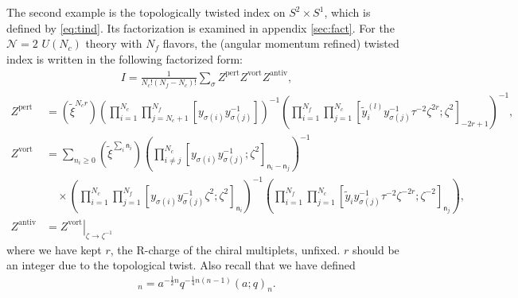 \documentclass[a4paper,11pt]{article}
\begin{document}
The second example is the topologically twisted index on $S^2 \times S^1$, which is defined by \eqref{eq:tind}. Its factorization is examined in appendix \ref{sec:fact}. For the $\mathcal N = 2$ $U(N_c)$ theory with $N_f$ flavors, the (angular momentum refined) twisted index is written in the following factorized form:
\begin{align}
I = \frac{1}{N_c! (N_f-N_c)!} \sum_{\sigma} Z^\text{pert} Z^\text{vort} Z^\text{antiv},
\end{align}
%
\begin{align}
%
Z^\text{pert} &= \left(\tilde \xi^{N_c r}\right) \left(\prod_{i = 1}^{N_c} \prod_{j = N_c+1}^{N_f} \left[y_{\sigma(i)} y_{\sigma(j)}^{-1}\right]\right)^{-1} \left(\prod_{i = 1}^{N_f} \prod_{j = 1}^{N_c} \left[\tilde y^{(l)}_i y_{\sigma(j)}^{-1} \tau^{-2} \zeta^{2 r};\zeta^2\right]_{-2 r+1}\right)^{-1}, \\
%
Z^\text{vort} &= \sum_{n_i \geq 0} \left(\tilde \xi^{\sum_i \mathsf n_i}\right) \left(\prod_{i \neq j}^{N_c} \left[y_{\sigma(i)} y_{\sigma(j)}^{-1};\zeta^2\right]_{\mathsf n_i-\mathsf n_j}\right)^{-1} \nonumber \\
%
& \quad \times \left(\prod_{i = 1}^{N_c} \prod_{j = 1}^{N_f} \left[y_{\sigma(i)} y_{\sigma(j)}^{-1} \zeta^2;\zeta^2\right]_{\mathsf n_i}\right)^{-1} \left(\prod_{i = 1}^{N_f} \prod_{j = 1}^{N_c} \left[\tilde y_i y_{\sigma(j)}^{-1} \tau^{-2} \zeta^{-2 r};\zeta^{-2}\right]_{\mathsf n_j}\right), \\
%
Z^\text{antiv} &= \left.Z^\text{vort}\right|_{\zeta \rightarrow \zeta^{-1}}
%
\end{align}
where we have kept $r$, the R-charge of the chiral multiplets, unfixed. $r$ should be an integer due to the topological twist. Also recall that we have defined
\begin{align}
[a;q]_n = a^{-\frac{1}{2} n} q^{-\frac{1}{4} n (n-1)} (a;q)_n.
\end{align}
\end{document}
